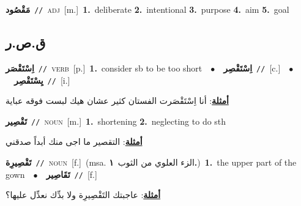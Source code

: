 \documentclass[10pt,a4paper,twoside]{article} %
\begin{document}
\begin{multicols}{2}
{\setlength\topsep{0pt}\textbf{\foreignlanguage{arabic}{مَقْصُود}}\ {\color{gray}\texttt{//}\color{black}}\ \textsc{adj}\ [m.]\ \textbf{1.}~deliberate  \textbf{2.}~intentional  \textbf{3.}~purpose  \textbf{4.}~aim  \textbf{5.}~goal\ } \vspace{2mm}

\vspace{-3mm}
\subsection*{\color{blue}\foreignlanguage{arabic}{ق.ص.ر}\color{blue}{}} 

{\setlength\topsep{0pt}\textbf{\foreignlanguage{arabic}{اِسْتَقْصَر}}\ {\color{gray}\texttt{//}\color{black}}\ \textsc{verb}\ [p.]\ \textbf{1.}~consider sb to be too short\ \ $\bullet$\ \ \setlength\topsep{0pt}\textbf{\foreignlanguage{arabic}{اِسْتَقْصِر}}\ {\color{gray}\texttt{//}\color{black}}\ [c.]\ \ $\bullet$\ \ \setlength\topsep{0pt}\textbf{\foreignlanguage{arabic}{يِسْتَقْصِر}}\ {\color{gray}\texttt{//}\color{black}}\ [i.]\  \begin{flushright}\color{gray}\foreignlanguage{arabic}{\textbf{\underline{\foreignlanguage{arabic}{أمثلة}}}: أنا اِسْتَقْصَرت الفستان كثير عشان هيك لبست فوقه عباية}\end{flushright}\color{black}} \vspace{2mm}

{\setlength\topsep{0pt}\textbf{\foreignlanguage{arabic}{تَقْصِير}}\ {\color{gray}\texttt{//}\color{black}}\ \textsc{noun}\ [m.]\ \textbf{1.}~shortening  \textbf{2.}~neglecting to do sth\  \begin{flushright}\color{gray}\foreignlanguage{arabic}{\textbf{\underline{\foreignlanguage{arabic}{أمثلة}}}: التقصير ما اجى منك أبداً صدقني}\end{flushright}\color{black}} \vspace{2mm}

{\setlength\topsep{0pt}\textbf{\foreignlanguage{arabic}{تَقْصِيرِة}}\ {\color{gray}\texttt{//}\color{black}}\ \textsc{noun}\ [f.]\ \color{gray}(msa. \foreignlanguage{arabic}{الزء العلوي من الثوب}~\foreignlanguage{arabic}{\textbf{١.}})\color{black}\ \textbf{1.}~the upper part of the gown\ \ $\bullet$\ \ \setlength\topsep{0pt}\textbf{\foreignlanguage{arabic}{تَقَاصِير}}\ {\color{gray}\texttt{//}\color{black}}\ [f.]\  \begin{flushright}\color{gray}\foreignlanguage{arabic}{\textbf{\underline{\foreignlanguage{arabic}{أمثلة}}}: عاجبتك التَقْصِيرِة ولا بدِّك نعدِّل عليها؟}\end{flushright}\color{black}} \vspace{2mm}


\end{multicols}
\end{document}
